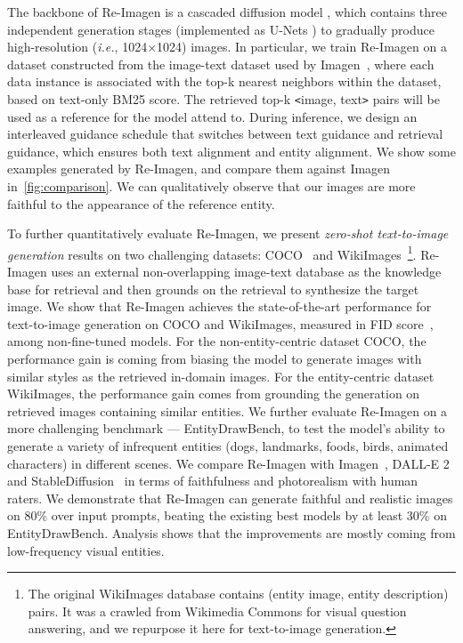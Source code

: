 \documentclass{article} \usepackage{iclr2023_conference,times}
\newcommand{\ie}{\textit{i.e.}}
\newcommand{\modelname}{{Re-Imagen}\xspace}
\begin{document}
The backbone of \modelname is a cascaded diffusion model \citep{ho2022cascaded}, which contains three independent generation stages (implemented as U-Nets \citep{ronneberger2015u}) to gradually produce high-resolution (\ie, 1024{$\times$}1024) images.
In particular, we train \modelname on a dataset constructed from the image-text dataset used by Imagen~\citep{saharia2022photorealistic}, where each data instance is associated with the top-k nearest neighbors within the dataset, based on text-only BM25 score. The retrieved top-k \texttt{<}image, text\texttt{>} pairs will be used as a reference for the model attend to. During inference, we design an interleaved guidance schedule that switches between text guidance and retrieval guidance, which ensures both text alignment and entity alignment. We show some examples generated by \modelname, and compare them against Imagen in~\autoref{fig:comparison}. We can qualitatively observe that our images are more faithful to the appearance of the reference entity.

To further quantitatively evaluate \modelname, we present \textit{zero-shot text-to-image generation} results on two challenging datasets: COCO~\citep{lin2014microsoft} and WikiImages~\citep{chang2022webqa}\footnote{The original WikiImages database contains (entity image, entity description) pairs. It was a crawled from Wikimedia Commons for visual question answering, and we repurpose it here for text-to-image generation.}. \modelname uses an external non-overlapping image-text database as the knowledge base for retrieval and then grounds on the retrieval to synthesize the target image. We show that \modelname achieves the state-of-the-art performance for text-to-image generation on COCO and WikiImages, measured in FID score~\citep{heusel2017gans}, among non-fine-tuned models. For the non-entity-centric dataset COCO, the performance gain is coming from biasing the model to generate images with similar styles as the retrieved in-domain images. For the entity-centric dataset WikiImages, the performance gain comes from grounding the generation on retrieved images containing similar entities. We further evaluate \modelname on a more challenging benchmark --- EntityDrawBench, to test the model's ability to generate a variety of infrequent entities (dogs, landmarks, foods, birds, animated characters) in different scenes. We compare \modelname with Imagen~\citep{saharia2022photorealistic}, DALL-E 2~\citep{ramesh2022hierarchical} and StableDiffusion~\citep{rombach2022high} in terms of faithfulness and photorealism with human raters. We demonstrate that \modelname can generate faithful and realistic images on 80\% over input prompts, beating the existing best models by at least 30\% on EntityDrawBench.  Analysis shows that the improvements are mostly coming from low-frequency visual entities.
\end{document}
